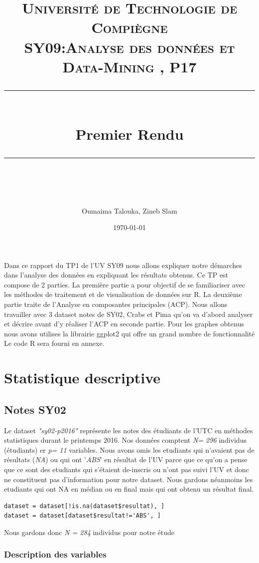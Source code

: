 \documentclass[10pt]{article}
\title{
	\normalfont \normalsize 
	\textsc{Université de Technologie de Compiègne\\ 
		SY09:Analyse des données et Data-Mining , P17} \\
	[10pt] 
	\rule{\linewidth}{0.5pt} \\[6pt] 
	\huge Premier Rendu \\
	\rule{\linewidth}{2pt}  \\[10pt]
}
\author{Oumaima Talouka, Zineb Slam}
\date{\normalsize \today}
\begin{document}
	
{\let\newpage\relax\maketitle}

Dans ce rapport du TP1 de l'UV SY09 nous allons expliquer notre démarches dans l'analyse des données en expliquant les résultats obtenus. Ce TP est compose de 2 parties. La première partie a pour objectif de se familiariser avec les méthodes de traitement et de visualisation de données sur R. La deuxième partie traite de l'Analyse en composantes principales (ACP). Nous allons travailler avec 3 dataset notes de SY02, Crabs et Pima qu'on va d'abord analyser et décrire avant d'y réaliser l'ACP en seconde partie. Pour les graphes obtenus nous avons utilises la librairie ggplot2 qui offre un grand nombre de fonctionnalité Le code R sera fourni en annexe.




\section{ Statistique descriptive}

\subsection{Notes SY02}
Le dataset \textit{"sy02-p2016"} représente les notes des étudiants de l'UTC en méthodes statistiques durant le printemps 2016. Nos données comptent \textit{N= 296} individus (étudiants) er \textit{p= 11} variables. Nous avons omis  les etudiants qui n'avaient pas de résultats (\textit{NA}) ou qui ont '\textit{ABS}' en résultat de l'UV parce que ce qu'on a pense que ce sont des etudiants qui s'étaient de-inscris ou n'ont pas suivi l'UV et donc ne constituent pas d'information pour notre dataset. Nous gardons néanmoins les etudiants qui ont NA en médian ou en final mais qui ont obtenu un résultat final. 

\begin{lstlisting}
dataset = dataset[!is.na(dataset$resultat), ]
dataset = dataset[dataset$resultat!='ABS', ]
\end{lstlisting}

Nous gardons donc \textit{N = 284} individus pour notre étude

 \subsubsection{Description des variables}
\end{document}
